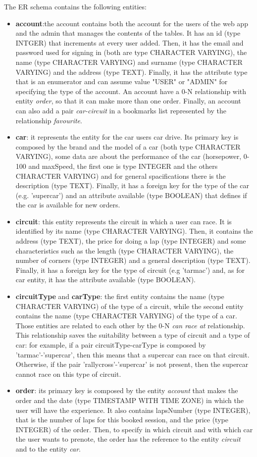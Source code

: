 The ER schema contains the following entities:
\begin{itemize}
	\item \textbf{account}:the account contains both the account for the users of the web app and the admin that manages the contents of the tables. It has an id (type INTGER) that increments at every user added. Then, it has the email and password used for signing in (both are type CHARACTER VARYING), the name (type CHARACTER VARYING) and surname (type CHARACTER VARYING) and the address (type TEXT). Finally, it has the attribute type that is an enumerator and can assume value "USER" or "ADMIN" for specifying the type of the account. An account have a 0-N relationship with entity \textit{order}, so that it can make more than one order. Finally, an account can also add a pair \textit{car-circuit} in a bookmarks list represented by the relationship \textit{favourite}.
	\item \textbf{car}: it represents the entity for the car users car drive. Its primary key is composed by the brand and the model of a car (both type CHARACTER VARYING), some data are about the performance of the car (horsepower, 0-100 and maxSpeed, the first one is type INTEGER and the others CHARACTER VARYING) and for general spacifications there is the description (type TEXT). Finally, it has a foreign key for the type of the car (e.g. 'supercar') and an attribute available (type BOOLEAN) that defines if the car is available for new orders.
	\item \textbf{circuit}: this entity represents the circuit in which a user can race. It is identified by its name (type CHARACTER VARYING). Then, it contains the address (type TEXT), the price for doing a lap (type INTEGER) and some characteristics such as the length (type CHARACTER VARYING), the number of corners (type INTEGER) and a general description (type TEXT). Finally, it has a foreign key for the type of circuit (e.g 'tarmac') and, as for car entity, it has the attribute available (type BOOLEAN). 
	\item \textbf{circuitType} and \textbf{carType}: the first entity contains the name (type CHARACTER VARYING) of the type of a circuit, while the second entity contains the name (type CHARACTER VARYING) of the type of a car. Those entities are related to each other by the 0-N \textit{can race at} relationship. This relationship saves the suitability between a type of circuit and a type of car: for example, if a pair circuitType-carType is composed by 'tarmac'-'supercar', then this means that a supercar can race on that circuit. Otherwise, if the pair 'rallycross'-'supercar' is not present, then the supercar cannot race on this type of circuit.
	\item \textbf{order}: its primary key is composed by the entity \textit{account} that makes the order and the date (type TIMESTAMP WITH TIME ZONE) in which the user will have the experience. It also contains lapsNumber (type INTEGER), that is the number of laps for this booked session, and the price (type INTEGER) of the order. Then, to specify in which circuit and with which car the user wants to prenote, the order has the reference to the entity \textit{circuit} and to the entity \textit{car}.
\end{itemize}
